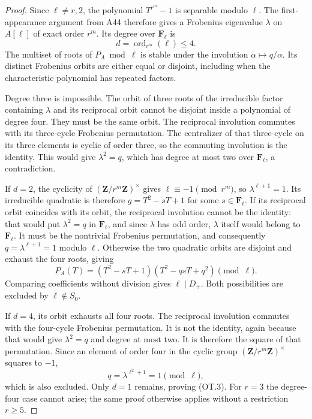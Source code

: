 \documentclass[11pt,a4paper]{article}
\begin{document}
\begin{proof}
Since $\ell\ne r,2$, the polynomial $T^{r^m}-1$ is separable
modulo $\ell$.  The first-appearance argument from A44 therefore
gives a Frobenius eigenvalue $\lambda$ on $A[\ell]$ of exact
order $r^m$.  Its degree over $\mathbf F_\ell$ is
\[
                 d=\operatorname{ord}_{r^m}(\ell)\le4.
\]
The multiset of roots of $P_A\bmod\ell$ is stable under the
involution $\alpha\mapsto q/\alpha$.  Its distinct Frobenius
orbits are either equal or disjoint, including when the
characteristic polynomial has repeated factors.

Degree three is impossible.  The orbit of three roots of the
irreducible factor containing $\lambda$ and its reciprocal orbit
cannot be disjoint inside a polynomial of degree four.  They must
be the same orbit.  The reciprocal involution commutes with its
three-cycle Frobenius permutation.  The centralizer of that
three-cycle on its three elements is cyclic of order three, so
the commuting involution is the identity.  This would give
$\lambda^2=q$, which has degree at most two over $\mathbf F_\ell$,
a contradiction.

If $d=2$, the cyclicity of
$(\mathbf Z/r^m\mathbf Z)^\times$ gives
$\ell\equiv-1\pmod{r^m}$, so
$\lambda^{\ell+1}=1$.  Its irreducible quadratic is therefore
$g=T^2-sT+1$ for some $s\in\mathbf F_\ell$.
If its reciprocal orbit coincides with its orbit, the reciprocal
involution cannot be the identity: that would put
$\lambda^2=q$ in $\mathbf F_\ell$, and since $\lambda$ has odd
order, $\lambda$ itself would belong to $\mathbf F_\ell$.
It must be the nontrivial Frobenius permutation, and consequently
$q=\lambda^{\ell+1}=1$ modulo $\ell$.
Otherwise the two quadratic orbits are disjoint and exhaust the
four roots, giving
\[
 P_A(T)=(T^2-sT+1)(T^2-qsT+q^2)\pmod\ell.
\]
Comparing coefficients without division gives $\ell\mid D_+$.
Both possibilities are excluded by $\ell\notin S_0$.

If $d=4$, its orbit exhausts all four roots.  The reciprocal
involution commutes with the four-cycle Frobenius permutation.
It is not the identity, again because that would give
$\lambda^2=q$ and degree at most two.  It is therefore the square
of that permutation.  Since an element of order four in the
cyclic group $(\mathbf Z/r^m\mathbf Z)^\times$ squares to $-1$,
\[
 q=\lambda^{\ell^2+1}=1\pmod\ell,
\]
which is also excluded.  Only $d=1$ remains, proving (OT.3).
For $r=3$ the degree-four case cannot arise; the same proof
otherwise applies without a restriction $r\ge5$.
\end{proof}
\end{document}
